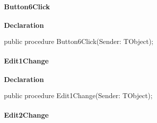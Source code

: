 \documentclass{report}
\newif\ifpdf
\begin{document}
\paragraph*{Button6Click}\hspace*{\fill}

\label{prjwizard.TfrmProjectWizard-Button6Click}
\begin{list}{}{
\setlength{\itemindent}{0cm}
\setlength{\listparindent}{0cm}
\setlength{\leftmargin}{\evensidemargin}
\addtolength{\leftmargin}{\tmplength}
\settowidth{\labelsep}{X}
\addtolength{\leftmargin}{\labelsep}
\setlength{\labelwidth}{\tmplength}
}
\item[\textbf{Declaration}\hfill]
\ifpdf
\begin{flushleft}
\fi
\begin{ttfamily}
public procedure Button6Click(Sender: TObject);\end{ttfamily}

\ifpdf
\end{flushleft}
\fi

\end{list}
\paragraph*{Edit1Change}\hspace*{\fill}

\label{prjwizard.TfrmProjectWizard-Edit1Change}
\begin{list}{}{
\setlength{\itemindent}{0cm}
\setlength{\listparindent}{0cm}
\setlength{\leftmargin}{\evensidemargin}
\addtolength{\leftmargin}{\tmplength}
\settowidth{\labelsep}{X}
\addtolength{\leftmargin}{\labelsep}
\setlength{\labelwidth}{\tmplength}
}
\item[\textbf{Declaration}\hfill]
\ifpdf
\begin{flushleft}
\fi
\begin{ttfamily}
public procedure Edit1Change(Sender: TObject);\end{ttfamily}

\ifpdf
\end{flushleft}
\fi

\end{list}
\paragraph*{Edit2Change}\hspace*{\fill}
\end{document}
